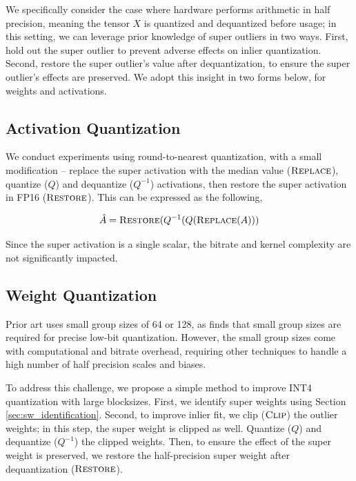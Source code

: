 \documentclass{article} %
\begin{document}
We specifically consider the case where hardware performs arithmetic in half precision, meaning the tensor $X$ is quantized and dequantized before usage; in this setting, we can leverage prior knowledge of super outliers in two ways. First, hold out the super outlier to prevent adverse effects on inlier quantization. Second, restore the super outlier's value after dequantization, to ensure the super outlier's effects are preserved. We adopt this insight in two forms below, for weights and activations.

\subsection{Activation Quantization}


We conduct experiments using round-to-nearest quantization, with a small modification -- replace the super activation with the median value ($\textsc{Replace}$), quantize ($Q$) and dequantize ($Q^{-1}$) activations, then restore the super activation in FP16 ($\textsc{Restore}$). This can be expressed as the following,


\begin{equation}
    \hat{A} = \textsc{Restore}(Q^{-1}(Q(\textsc{Replace}(A)))
\end{equation}

Since the super activation is a single scalar, the bitrate and kernel complexity are not significantly impacted.


\subsection{Weight Quantization}

Prior art uses \citep{dettmers2023qlora, lin2024awq} small group sizes of 64 or 128, as \citet{dettmers2023case} finds that small group sizes are required for precise low-bit quantization. However, the small group sizes come with computational and bitrate overhead, requiring other techniques to handle a high number of half precision scales and biases.

To address this challenge, we propose a simple method to improve INT4 quantization with large blocksizes. First, we identify super weights using Section \ref{sec:sw_identification}. Second, to improve inlier fit, we clip ($\textsc{Clip}$) the outlier weights; in this step, the super weight is clipped as well. Quantize ($Q$) and dequantize ($Q^{-1}$) the clipped weights. Then, to ensure the effect of the super weight is preserved, we restore the half-precision super weight after dequantization ($\textsc{Restore}$).
\end{document}
